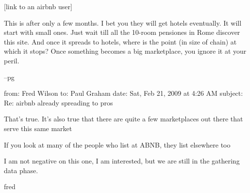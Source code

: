 [link to an airbnb user]

This is after only a few months.  I bet you they will get hotels
eventually.  It will start with small ones.  Just wait till all the
10-room pensiones in Rome discover this site.  And once it spreads
to hotels, where is the point (in size of chain) at which it stops?
Once something becomes a big marketplace, you ignore it at your
peril.

--pg



from: Fred Wilson
to: Paul Graham
date: Sat, Feb 21, 2009 at 4:26 AM
subject: Re: airbnb already spreading to pros

That's true. It's also true that there are quite a few marketplaces
out there that serve this same market

If you look at many of the people who list at ABNB, they list
elsewhere too

I am not negative on this one, I am interested, but we are still
in the gathering data phase.

fred





